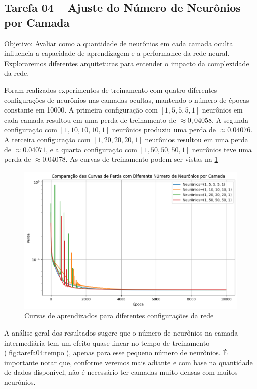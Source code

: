 \subsection{Tarefa 04 -- Ajuste do Número de Neurônios por Camada}

\begin{comandoquestao}
	Objetivo: Avaliar como a quantidade de neurônios em cada camada oculta 
	influencia a capacidade de aprendizagem e a performance da rede neural. 
	Exploraremos diferentes arquiteturas para entender o impacto da 
	complexidade da 	rede.
\end{comandoquestao}

Foram realizados experimentos de treinamento com quatro diferentes 
configurações de neurônios nas camadas ocultas, mantendo o número de épocas 
constante em 10000. A primeira configuração com $[1, 5, 5, 5, 1]$ neurônios em 
cada camada resultou em uma perda de treinamento de $\approx 0,04058$. A 
segunda configuração com $[1, 10, 10, 10, 1]$ neurônios produziu uma perda de 
$\approx 0.04076$. A terceira configuração com $[1, 20, 20, 20, 1]$ neurônios 
resultou em 
uma perda de $\approx 0.04071$, e a quarta configuração com $[1, 50, 50, 50, 
1]$ neurônios 
teve uma perda de $\approx 0.04078$. As curvas de treinamento podem ser vistas 
na \cref{fig:tarefa04:curvas}

\begin{figure}[tbh]
	\centering
	\caption{Curvas de aprendizados para diferentes configurações da rede}
	\label{fig:tarefa04:curvas}
	\includegraphics[width=0.7\linewidth]{./0803_imgs/png-241110-190844867-15619254497487317135.png}
\end{figure}

A análise geral dos resultados sugere que o número de neurônios na camada 
intermediária tem um efeito quase linear no tempo de treinamento 
(\cref{fig:tarefa04:tempo}), 
apenas para esse pequeno número de neurônios. É importante notar que, conforme 
veremos mais adiante e com base na quantidade de dados disponível, não é 
necessário ter camadas muito densas com muitos neurônios.

